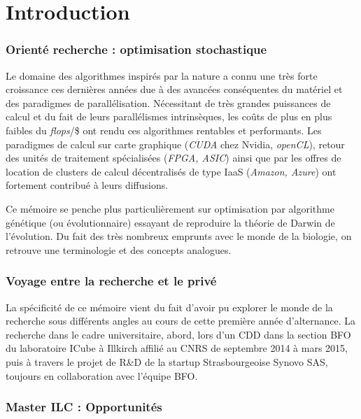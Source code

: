 \documentclass[french, 11pt]{memoir}
\begin{document}
\newpage
\section{Introduction}\label{introduction}

\subsubsection{Orienté recherche : optimisation
	stochastique}\label{orientuxe9-recherche-optimisation-stochastique}

Le domaine des algorithmes inspirés par la nature a connu une très forte
croissance ces dernières années due à des avancées conséquentes du
matériel et des paradigmes de parallélisation. Nécessitant de très
grandes puissances de calcul et du fait de leurs parallélismes
intrinsèques, les coûts de plus en plus faibles du \emph{flops}/\$ ont
rendu ces algorithmes rentables et performants. Les paradigmes de calcul
sur carte graphique (\emph{CUDA} chez Nvidia, \emph{openCL}), retour des
unités de traitement spécialisées (\emph{FPGA, ASIC}) ainsi que par les
offres de location de clusters de calcul décentralisés de type IaaS
(\emph{Amazon, Azure}) ont fortement contribué à leurs diffusions.

Ce mémoire se penche plus particulièrement sur optimisation par
algorithme génétique (ou évolutionnaire) essayant de reproduire la
théorie de Darwin de l'évolution. Du fait des très nombreux emprunts
avec le monde de la biologie, on retrouve une terminologie et des
concepts analogues.

\subsubsection{Voyage entre la recherche et le
	privé}\label{voyage-entre-la-recherche-et-le-privuxe9}

La spécificité de ce mémoire vient du fait d'avoir pu explorer le monde
de la recherche sous différents angles au cours de cette première année
d'alternance. La recherche dans le cadre universitaire, abord, lors d'un
CDD dans la section BFO du laboratoire ICube à Illkirch affilié au CNRS
de septembre 2014 à mars 2015, puis à travers le projet de R\&D de la
startup Strasbourgeoise Synovo SAS, toujours en collaboration avec
l'équipe BFO.

\subsubsection{Master ILC :
	Opportunités}\label{master-ilc-opportunituxe9s}
\end{document}
